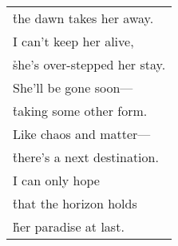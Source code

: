 \documentclass{article}
\begin{document}
\begin{center}
\begin{tabular}{l}
\h the dawn takes her away. \\
I can't keep her alive, \\
\h she's over-stepped her stay. \\
She'll be gone soon--- \\
\h taking some other form. \\
Like chaos and matter--- \\
\h there's a next destination. \\
I can only hope \\
\h that the horizon holds \\
\h\h her paradise at last. \\
\end{tabular}
%
%
%
%
%

\end{center}
\end{document}
